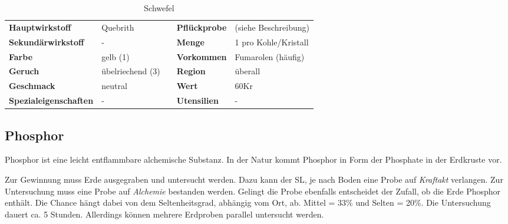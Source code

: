 \begin{table}[h] 
\begin{center} 
\begin{tabular}{|l|l|p{1cm}|l|l|} 
  	\cline{1-2} \cline{4-5} 
  	\textbf{Hauptwirkstoff} & Quebrith && \textbf{Pflückprobe} & (siehe Beschreibung) \\ \cline{1-2} \cline{4-5} 
  	\textbf{Sekundärwirkstoff} & - && \textbf{Menge} & 1 pro Kohle/Kristall \\ \cline{1-2} \cline{4-5} 
  	\textbf{Farbe} & gelb (1) && \textbf{Vorkommen} & Fumarolen (häufig) \\ \cline{1-2} \cline{4-5} 
  	\textbf{Geruch} & übelriechend (3) && \textbf{Region} & überall \\ \cline{1-2} \cline{4-5} 
  	\textbf{Geschmack} & neutral && \textbf{Wert} & 60Kr \\ \cline{1-2} \cline{4-5} 
  	\textbf{Spezialeigenschaften} & - && \textbf{Utensilien} & - \\ \cline{1-2} \cline{4-5} 
\end{tabular} 
\end{center} 
\caption{Schwefel} 
\label{tab:schwefel} 
\end{table}


\subsection{Phosphor}
Phosphor ist eine leicht entflammbare alchemische Substanz. In der Natur kommt Phosphor in Form der Phosphate in der Erdkruste vor. 

Zur Gewinnung muss Erde ausgegraben und untersucht werden. Dazu kann der SL, je nach Boden eine Probe auf \textit{Kraftakt} verlangen. Zur Untersuchung muss eine Probe auf \textit{Alchemie} bestanden werden. Gelingt die Probe ebenfalls entscheidet der Zufall, ob die Erde Phosphor enthält. Die Chance hängt dabei von dem Seltenheitsgrad, abhängig vom Ort, ab. Mittel = 33\% und Selten = 20\%. Die Untersuchung dauert ca. 5 Stunden. Allerdings können mehrere Erdproben parallel untersucht werden.

